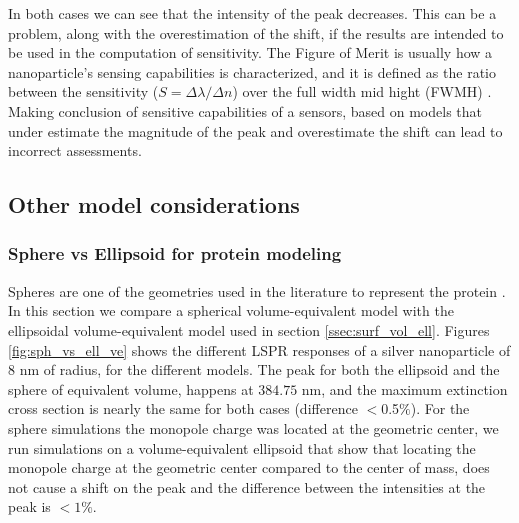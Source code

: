 In both cases we can see that the intensity of the peak decreases. This can be a problem, along with the overestimation of the shift,
if the results are intended to be used in the computation of sensitivity. The Figure of Merit is usually how a
nanoparticle's sensing capabilities is characterized, and it is defined as the ratio between the 
sensitivity ($S = \Delta \lambda / \Delta n$) over the full width mid hight (FWMH) \cite{otte2012}. Making 
conclusion of sensitive capabilities of a sensors, based on models that under estimate the magnitude of the peak and 
overestimate the shift can lead to incorrect assessments.

\subsection{Other model considerations}

\subsubsection{Sphere vs Ellipsoid for protein modeling}

Spheres are one of the geometries used in the literature to represent the protein \cite{SantiagoCordobaETal2011, UngerETal2009}. In this 
section we compare a spherical volume-equivalent model with the ellipsoidal volume-equivalent model used in section
\ref{ssec:surf_vol_ell}. Figures \ref{fig:sph_vs_ell_ve} shows the different LSPR responses of a silver nanoparticle of $8$ nm of radius, 
for the different models. The peak for both the ellipsoid and the sphere of equivalent volume, happens at $384.75$ nm, and the 
maximum extinction cross section is nearly the same for both cases (difference $<$0.5$\%$). For the sphere simulations 
the monopole charge was located at the geometric center, we run simulations on a volume-equivalent ellipsoid that show 
that locating the monopole charge at the geometric center compared to the center of mass, does not cause a shift on the peak 
and the difference between the intensities at the peak is $<1\%$.


